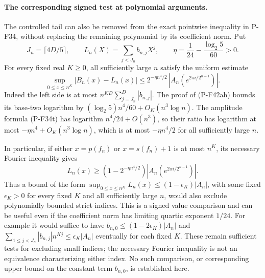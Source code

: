 \paragraph{The corresponding signed test at polynomial arguments.}
The controlled tail can also be removed from the exact
pointwise inequality in P-F34, without replacing the
remaining polynomial by its coefficient norm.
Put
\[
 J_n=\lceil4D/5\rceil,\qquad
 L_n(X)=\sum_{j<J_n}b_{n,j}X^j,\qquad
 \eta=\frac1{24}-\frac{\log_2 5}{60}>0.
 \tag{P-F42ai}
\]
For every fixed real \(K\ge0\), all sufficiently large \(n\)
satisfy the uniform estimate
\[
 \sup_{0\le x\le n^K}|B_n(x)-L_n(x)|
       \le 2^{-\eta n^4/2}\,
                 |A_n(e^{2\pi i/2^{n-1}})|.
 \tag{P-F42aj}
\]
Indeed the left side is at most
\(n^{KD}\sum_{j=J_n}^D|b_{n,j}|\).
The proof of (P-F42ah) bounds its base-two logarithm by
\((\log_2 5)n^4/60+O_K(n^3\log n)\).
The amplitude formula (P-F34t) has logarithm
\(n^4/24+O(n^3)\), so their ratio has logarithm at most
\(-\eta n^4+O_K(n^3\log n)\), which is at most
\(-\eta n^4/2\) for all sufficiently large \(n\).

In particular, if either \(x=p(f_n)\) or \(x=s(f_n)+1\)
is at most \(n^K\), its necessary Fourier inequality gives
\[
 L_n(x)\ge
       (1-2^{-\eta n^4/2})
                 |A_n(e^{2\pi i/2^{n-1}})|.
 \tag{P-F42ak}
\]
Thus a bound of the form
\(\sup_{0\le x\le n^K}L_n(x)\le(1-\epsilon_K)|A_n|\),
with some fixed \(\epsilon_K>0\) for every fixed \(K\)
and all sufficiently large \(n\), would also exclude
polynomially bounded strict indices. This is a signed
value comparison and can be useful even if the coefficient
norm has limiting quartic exponent \(1/24\).
For example it would suffice to have
\(b_{n,0}\le(1-2\epsilon_K)|A_n|\) and
\(\sum_{1\le j<J_n}|b_{n,j}|n^{Kj}\le\epsilon_K|A_n|\)
eventually for each fixed \(K\).
These remain sufficient tests for excluding small indices;
the necessary Fourier inequality is not an equivalence
characterizing either index.
No such comparison, or corresponding upper bound on
the constant term \(b_{n,0}\), is established here.

